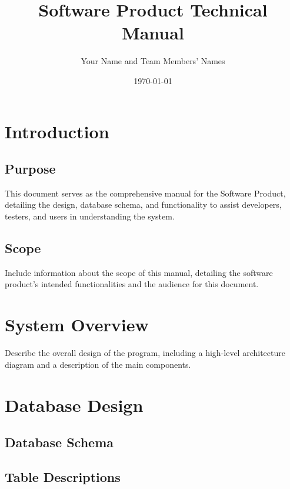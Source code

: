 \documentclass[12pt]{article}
\title{Software Product Technical Manual}
\author{Your Name and Team Members' Names}
\date{\today}
\begin{document}
\maketitle
\tableofcontents
\newpage

\section{Introduction}
\subsection{Purpose}
This document serves as the comprehensive manual for the Software Product, detailing the design, database schema, and functionality to assist developers, testers, and users in understanding the system.

\subsection{Scope}
Include information about the scope of this manual, detailing the software product's intended functionalities and the audience for this document.

\section{System Overview}
Describe the overall design of the program, including a high-level architecture diagram and a description of the main components.

\section{Database Design}
\subsection{Database Schema}

\subsection{Table Descriptions}
\end{document}
